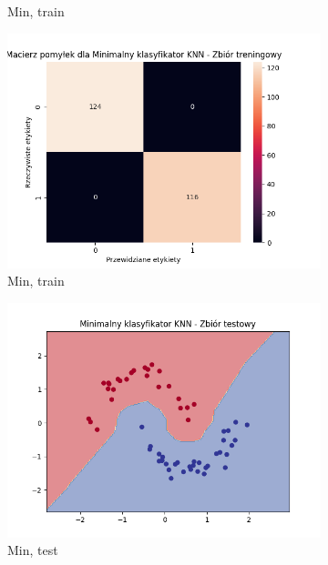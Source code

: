 \documentclass[12pt]{article}
\newcommand*{\subfigwidth}{0.15\textwidth}
\begin{document}
\begin{figure}[H]
\begin{subfigure}[t]{\subfigwidth}
        \caption{Min, train}
    \end{subfigure}
    \hfill
    \begin{subfigure}[t]{\subfigwidth}
        \includegraphics[width=\linewidth]{img/exp_2/knn/2_2/min/train_matrix.png}
        \caption{Min, train}
    \end{subfigure}
    \hfill
    \begin{subfigure}[t]{\subfigwidth}
        \includegraphics[width=\linewidth]{img/exp_2/knn/2_2/min/test_boundary.png}
        \caption{Min, test}
    \end{subfigure}
    \hfill
    \begin{subfigure}[t]{\subfigwidth}

\end{subfigure}
\end{figure}
\end{document}
